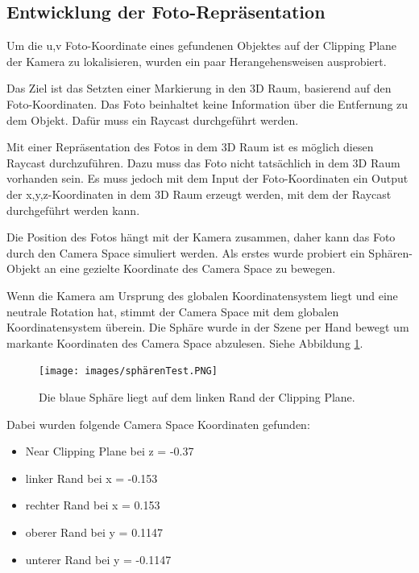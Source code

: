 \subsection{Entwicklung der Foto-Repräsentation}
\label{section:devpixeltoworld}

Um die u,v Foto-Koordinate eines gefundenen Objektes auf der Clipping Plane der Kamera zu lokalisieren, wurden ein paar Herangehensweisen ausprobiert.

Das Ziel ist das Setzten einer Markierung in den 3D Raum, basierend auf den Foto-Koordinaten. Das Foto beinhaltet keine Information über die Entfernung zu dem Objekt. Dafür muss ein Raycast durchgeführt werden. 

Mit einer Repräsentation des Fotos in dem 3D Raum ist es möglich diesen Raycast durchzuführen. 
Dazu muss das Foto nicht tatsächlich in dem 3D Raum vorhanden sein. Es muss jedoch mit dem Input der Foto-Koordinaten ein Output der x,y,z-Koordinaten in dem 3D Raum erzeugt werden, mit dem der Raycast durchgeführt werden kann.

Die Position des Fotos hängt mit der Kamera zusammen, daher kann das Foto durch den Camera Space simuliert werden. Als erstes wurde probiert ein Sphären-Objekt an eine gezielte Koordinate des Camera Space zu bewegen. 

Wenn die Kamera am Ursprung des globalen Koordinatensystem liegt und eine neutrale Rotation hat, stimmt der Camera Space mit dem globalen Koordinatensystem überein. Die Sphäre wurde in der Szene per Hand bewegt um markante Koordinaten des Camera Space abzulesen. Siehe Abbildung \ref{illustration:speretest}.

\begin{figure}[H]
	\centering
	\texttt{[image: images/sphärenTest.PNG]}
	\caption[]{Die blaue Sphäre liegt auf dem linken Rand der Clipping Plane.}
	\label{illustration:speretest}
\end{figure}

Dabei wurden folgende Camera Space Koordinaten gefunden:
\begin{itemize}
	\item Near Clipping Plane bei z = -0.37
	\item linker Rand bei x = -0.153
	\item rechter Rand bei x = 0.153
	\item oberer Rand bei y = 0.1147
	\item unterer Rand bei y = -0.1147
\end{itemize}

